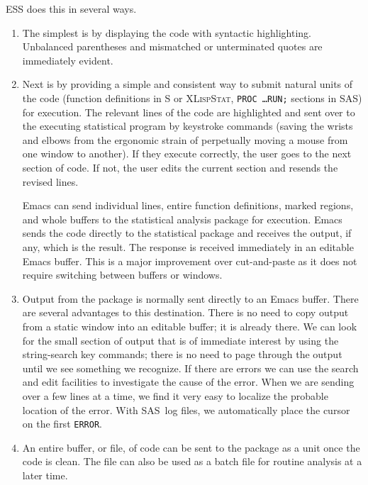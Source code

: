 \documentclass{article}
\newcommand*{\SAS}{\textsc{SAS}}
\newcommand*{\XLispStat}{\textsc{XLispStat}}
\newcommand{\stexttt}[1]{{\small\texttt{#1}}}
\begin{document}
ESS does this in several ways.
\begin{enumerate}
\item The simplest is by displaying the code with syntactic highlighting.
Unbalanced parentheses and mismatched or unterminated quotes are immediately
evident.

\item Next is by providing a simple and consistent way to submit
natural units of the code (function definitions in S or \XLispStat,
\stexttt{PROC \dots RUN;} sections in \SAS) for execution.
The relevant lines of the code are highlighted and sent over to the
executing statistical program by keystroke commands (saving the wrists
and elbows from the ergonomic strain of perpetually moving a mouse from
one window to another).  If they execute correctly, the user goes to the
next section of code.  If not, the user edits the current section and resends
the revised lines.

Emacs can send individual lines, entire function definitions, marked
regions, and whole buffers to the statistical analysis package for
execution.  Emacs sends the code directly to
the statistical package and receives the output, if any, which is
the result.  The response is received immediately in an editable Emacs buffer.
This is a major improvement over cut-and-paste as it does
not require switching between buffers or windows.

\item
Output from the package is normally sent directly to an Emacs buffer.
There are several advantages to this destination.
There is no need to copy output from a static window into an
editable buffer; it is already there.
We can look for the
small section of output that is of immediate interest by using the
string-search key commands; there is no need to page through the
output until we see something we recognize.
If there are errors we
can use the search and edit facilities to investigate the cause of the
error.  When we are sending over a few lines at a time, we find
it very easy to localize the probable location of the error.
With \SAS\ log files, we automatically place the cursor
on the first \stexttt{ERROR}.

\item
An entire buffer, or file, of code can be sent to the package as a unit
once the code is clean.  The file can also be used as a batch file for
routine analysis at a later time.

\end{enumerate}
\end{document}
